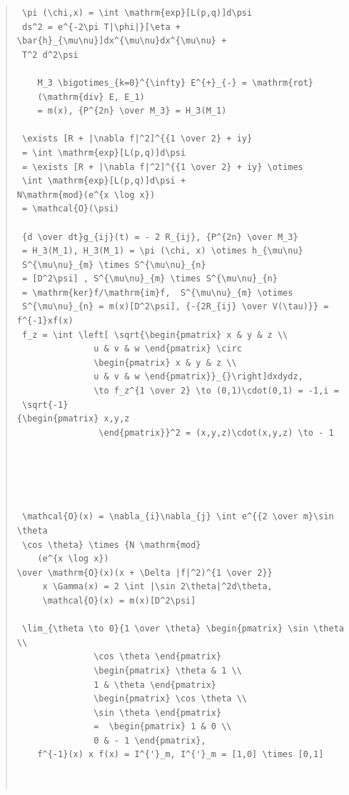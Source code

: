 \documentclass{jsarticle}
\begin{document}
\begin{quote}
\begin{verbatim}
 \pi (\chi,x) = \int \mathrm{exp}[L(p,q)]d\psi 
 ds^2 = e^{-2\pi T|\phi|}[\eta + \bar{h}_{\mu\nu}]dx^{\mu\nu}dx^{\mu\nu} + 
 T^2 d^2\psi 

    M_3 \bigotimes_{k=0}^{\infty} E^{+}_{-} = \mathrm{rot}
    (\mathrm{div} E, E_1)
    = m(x), {P^{2n} \over M_3} = H_3(M_1) 

 \exists [R + |\nabla f|^2]^{{1 \over 2} + iy} 
 = \int \mathrm{exp}[L(p,q)]d\psi 
 = \exists [R + |\nabla f|^2]^{{1 \over 2} + iy} \otimes 
 \int \mathrm{exp}[L(p,q)]d\psi +
N\mathrm{mod}(e^{x \log x}) 
 = \mathcal{O}(\psi) 

 {d \over dt}g_{ij}(t) = - 2 R_{ij}, {P^{2n} \over M_3} 
 = H_3(M_1), H_3(M_1) = \pi (\chi, x) \otimes h_{\mu\nu} 
 S^{\mu\nu}_{m} \times S^{\mu\nu}_{n}
 = [D^2\psi] , S^{\mu\nu}_{m} \times S^{\mu\nu}_{n}
 = \mathrm{ker}f/\mathrm{im}f,  S^{\mu\nu}_{m} \otimes 
 S^{\mu\nu}_{n} = m(x)[D^2\psi], {-{2R_{ij} \over V(\tau)}} = f^{-1}xf(x) 
 f_z = \int \left[ \sqrt{\begin{pmatrix} x & y & z \\
			   u & v & w \end{pmatrix} \circ 
			   \begin{pmatrix} x & y & z \\
			   u & v & w \end{pmatrix}}_{}\right]dxdydz, 
			   \to f_z^{1 \over 2} \to (0,1)\cdot(0,1) = -1,i = 
 \sqrt{-1} 
{\begin{pmatrix} x,y,z
			    \end{pmatrix}}^2 = (x,y,z)\cdot(x,y,z) \to - 1 

			  



 \mathcal{O}(x) = \nabla_{i}\nabla_{j} \int e^{{2 \over m}\sin \theta
 \cos \theta} \times {N \mathrm{mod}
	(e^{x \log x})
\over \mathrm{O}(x)(x + \Delta |f|^2)^{1 \over 2}} 
	 x \Gamma(x) = 2 \int |\sin 2\theta|^2d\theta, 
	 \mathcal{O}(x) = m(x)[D^2\psi] 
	
 \lim_{\theta \to 0}{1 \over \theta} \begin{pmatrix} \sin \theta \\
			   \cos \theta \end{pmatrix} 
			   \begin{pmatrix} \theta & 1 \\
			   1 & \theta \end{pmatrix} 
			   \begin{pmatrix} \cos \theta \\
			   \sin \theta \end{pmatrix}
			   =  \begin{pmatrix} 1 & 0 \\
			   0 & - 1 \end{pmatrix}, 
	f^{-1}(x) x f(x) = I^{'}_m, I^{'}_m = [1,0] \times [0,1] 



\end{verbatim}
\end{quote}
\end{document}

